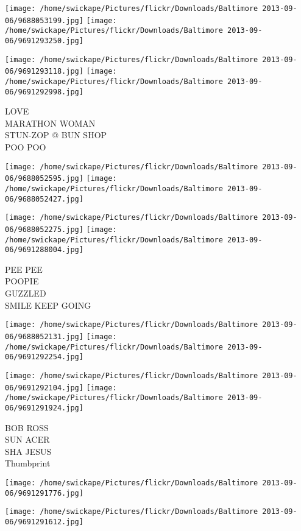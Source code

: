 \documentclass[10pt,letterpaper]{article}
\begin{document}
\texttt{[image: /home/swickape/Pictures/flickr/Downloads/Baltimore 2013-09-06/9688053199.jpg]}
\texttt{[image: /home/swickape/Pictures/flickr/Downloads/Baltimore 2013-09-06/9691293250.jpg]}

\texttt{[image: /home/swickape/Pictures/flickr/Downloads/Baltimore 2013-09-06/9691293118.jpg]}
\texttt{[image: /home/swickape/Pictures/flickr/Downloads/Baltimore 2013-09-06/9691292998.jpg]}

LOVE\\
MARATHON WOMAN\\
STUN{-}ZOP @ BUN SHOP\\
POO POO\\
\pagebreak

\texttt{[image: /home/swickape/Pictures/flickr/Downloads/Baltimore 2013-09-06/9688052595.jpg]}
\texttt{[image: /home/swickape/Pictures/flickr/Downloads/Baltimore 2013-09-06/9688052427.jpg]}

\texttt{[image: /home/swickape/Pictures/flickr/Downloads/Baltimore 2013-09-06/9688052275.jpg]}
\texttt{[image: /home/swickape/Pictures/flickr/Downloads/Baltimore 2013-09-06/9691288004.jpg]}

PEE PEE\\
POOPIE\\
GUZZLED\\
SMILE KEEP GOING\\
\pagebreak

\texttt{[image: /home/swickape/Pictures/flickr/Downloads/Baltimore 2013-09-06/9688052131.jpg]}
\texttt{[image: /home/swickape/Pictures/flickr/Downloads/Baltimore 2013-09-06/9691292254.jpg]}

\texttt{[image: /home/swickape/Pictures/flickr/Downloads/Baltimore 2013-09-06/9691292104.jpg]}
\texttt{[image: /home/swickape/Pictures/flickr/Downloads/Baltimore 2013-09-06/9691291924.jpg]}

BOB ROSS\\
SUN ACER\\
SHA JESUS\\
Thumbprint\\
\pagebreak

\texttt{[image: /home/swickape/Pictures/flickr/Downloads/Baltimore 2013-09-06/9691291776.jpg]}

\vspace{0.25in}
\texttt{[image: /home/swickape/Pictures/flickr/Downloads/Baltimore 2013-09-06/9691291612.jpg]}
\end{document}
